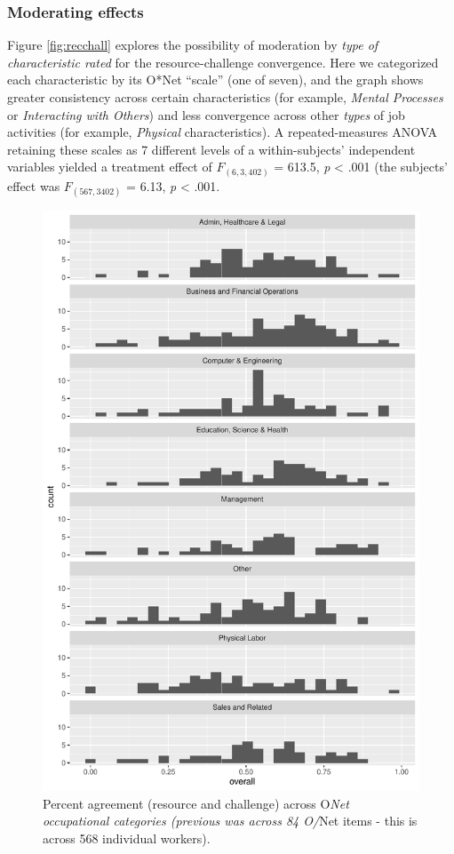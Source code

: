 \documentclass[
  man]{apa6}
\begin{document}
\hypertarget{moderating-effects}{%
\subsubsection{Moderating effects}\label{moderating-effects}}

Figure \ref{fig:recchall} explores the possibility of moderation by \emph{type of characteristic rated} for the resource-challenge convergence. Here we categorized each characteristic by its O*Net ``scale'' (one of seven), and the graph shows greater consistency across certain characteristics (for example, \emph{Mental Processes} or \emph{Interacting with Others}) and less convergence across other \emph{types} of job activities (for example, \emph{Physical} characteristics). A repeated-measures ANOVA retaining these scales as 7 different levels of a within-subjects' independent variables yielded a treatment effect of \(F_{(6, 3,402)}\) = 613.5, \emph{p} \textless{} .001 (the subjects' effect was \(F_{(567, 3402)}\) = 6.13, \emph{p} \textless{} .001.

\begin{figure}
\centering
\includegraphics{copy-of-SIOP2023convergence_files/figure-latex/workcat-1.pdf}
\caption{\label{fig:workcat}Percent agreement (resource and challenge) across O\emph{Net occupational categories (previous was across 84 O/}Net items - this is across 568 individual workers).}
\end{figure}
\end{document}
